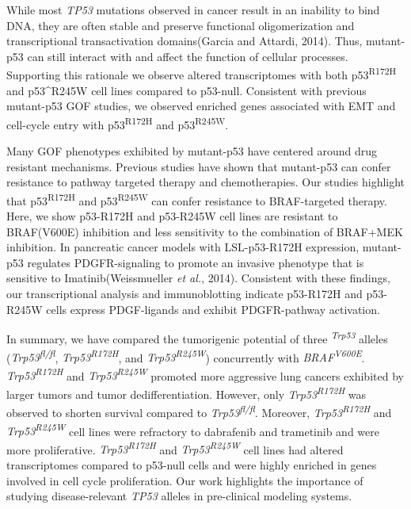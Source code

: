 While most \emph{TP53} mutations observed in cancer result in an inability to bind DNA, they are often stable and preserve functional oligomerization and transcriptional transactivation domains(Garcia and Attardi, 2014). Thus, mutant-p53 can still interact with and affect the function of cellular processes. Supporting this rationale we observe altered transcriptomes with both p53\textsuperscript{R172H} and p53\^{}R245W cell lines compared to p53-null. Consistent with previous mutant-p53 GOF studies, we observed enriched genes associated with EMT and cell-cycle entry with p53\textsuperscript{R172H} and p53\textsuperscript{R245W}.

Many GOF phenotypes exhibited by mutant-p53 have centered around drug resistant mechanisms. Previous studies have shown that mutant-p53 can confer resistance to pathway targeted therapy and chemotherapies. Our studies highlight that p53\textsuperscript{R172H} and p53\textsuperscript{R245W} can confer resistance to BRAF-targeted therapy. Here, we show p53-R172H and p53-R245W cell lines are resistant to BRAF(V600E) inhibition and less sensitivity to the combination of BRAF+MEK inhibition. In pancreatic cancer models with LSL-p53-R172H expression, mutant-p53 regulates PDGFR-signaling to promote an invasive phenotype that is sensitive to Imatinib(Weissmueller \emph{et al.}, 2014). Consistent with these findings, our transcriptional analysis and immunoblotting indicate p53-R172H and p53-R245W cells express PDGF-ligands and exhibit PDGFR-pathway activation.

In summary, we have compared the tumorigenic potential of three \emph{\textsuperscript{Trp53}} alleles (\emph{Trp53\textsuperscript{fl/fl}}, \emph{Trp53\textsuperscript{R172H}}, and \emph{Trp53\textsuperscript{R245W}}) concurrently with \emph{BRAF\textsuperscript{V600E}}. \emph{Trp53\textsuperscript{R172H}} and \emph{Trp53\textsuperscript{R245W}} promoted more aggressive lung cancers exhibited by larger tumors and tumor dedifferentiation. However, only \emph{Trp53\textsuperscript{R172H}} was observed to shorten survival compared to \emph{Trp53\textsuperscript{fl/fl}}. Moreover, \emph{Trp53\textsuperscript{R172H}} and \emph{Trp53\textsuperscript{R245W}} cell lines were refractory to dabrafenib and trametinib and were more proliferative. \emph{Trp53\textsuperscript{R172H}} and \emph{Trp53\textsuperscript{R245W}} cell lines had altered transcriptomes compared to p53-null cells and were highly enriched in genes involved in cell cycle proliferation. Our work highlights the importance of studying disease-relevant \emph{TP53} alleles in pre-clinical modeling systems.

